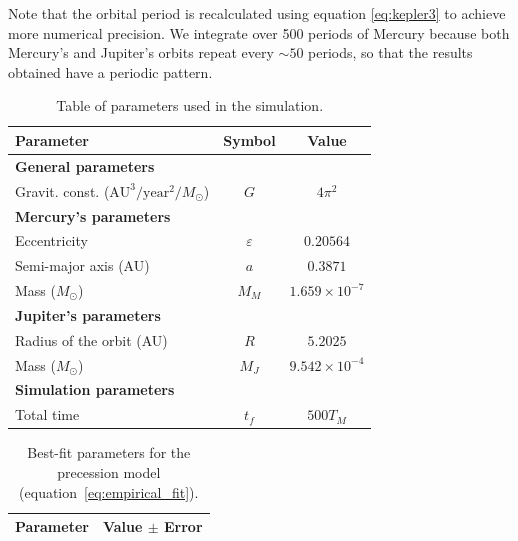 \documentclass[journal]{IEEEtran}
\begin{document}
Note that the orbital period is recalculated using equation \eqref{eq:kepler3} to achieve more numerical precision. We integrate over 500 periods of Mercury because both Mercury's and Jupiter's orbits repeat every $\sim 50$ periods, so that the results obtained have a periodic pattern.
\begin{table}[!ht]
    \centering
    \caption{Table of parameters used in the simulation.}
    \renewcommand{\arraystretch}{1}
    \setlength{\tabcolsep}{6.5pt} %
    \begin{tabular}{| l | c | c |}
        \hline
        \textbf{Parameter} & \textbf{Symbol} & \textbf{Value} \\
        \hline
        \multicolumn{3}{|l|}{\textbf{General parameters}} \\
        \hline
        Gravit. const. ($\text{AU}^3/\text{year}^2/M_\odot$)& $G$ & $4\pi^2$ \\
        \hline
        \multicolumn{3}{|l|}{\textbf{Mercury's parameters}} \\
        \hline
        Eccentricity & $\varepsilon$ & $0.20564$ \\
        Semi-major axis (AU) & $a$ & $0.3871$ \\
        Mass ($M_\odot$) & $M_M$ & $1.659 \times 10^{-7}$ \\
        \hline
        \multicolumn{3}{|l|}{\textbf{Jupiter's parameters}} \\
        \hline
        Radius of the orbit (AU) & $R$ & $5.2025$ \\
        Mass ($M_\odot$)& $M_J$ & $9.542 \times 10^{-4}$ \\
        \hline
        \multicolumn{3}{|l|}{\textbf{Simulation parameters}} \\
        \hline
        Total time & $t_f$ & $500T_M$ \\
        \hline
    \end{tabular}
    \label{tab:parametros}
\end{table}

\begin{table}[!ht]
    \centering
    \caption{Best-fit parameters for the precession model (equation~\eqref{eq:empirical_fit}).}
    \label{tab:fit_params}
    \begin{tabular}{ll}
        \toprule
        Parameter & Value $\pm$ Error \\
        \midrule
        
    \end{tabular}
\end{table}
\end{document}
